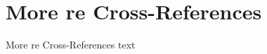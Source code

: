 
\section{More re Cross-References}\fbeg{}\begin{frame}{}

{\fontsize{20}{23}\selectfont

More re Cross-References text

}

\end{frame}

